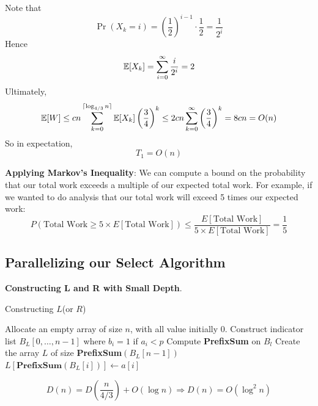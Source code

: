 \documentclass[11pt]{article}
\begin{document}
Note that
\begin{equation*}
\Pr(X_k=i)=\left( \frac{1}{2} \right)^{i-1}\cdot\frac{1}{2}=\frac{1}{2^i}
\end{equation*}
Hence
\begin{equation*}
\mathbb{E}[X_k]=\sum_{i=0}^\infty\frac{i}{2^i}=2
\end{equation*}
Ultimately,
\begin{equation*}
\mathbb{E}[W]\le cn\sum_{k=0}^{\lceil \log_{4/3}n \rceil}\mathbb{E}[X_k]\left( \frac{3}{4} \right)^k\le
2cn\sum_{k=0}^\infty\left( \frac{3}{4} \right)^k=8cn=O(n)
\end{equation*}
So in expectation,
\begin{equation*}
T_1=O(n)
\end{equation*}

\textbf{Applying Markov's Inequality}: We can compute a bound on the probability that our total work
 exceeds a multiple of our expected total work. For example, if we wanted to do analysis that
 our total work will exceed 5 times our expected work:
 \begin{equation*}
P(\text{Total Work}\ge 5\times E[\text{Total Work}])\le\frac{E[\text{Total Work}]}{5\times E[\text{Total Work}]}=\frac{1}{5}
 \end{equation*}
\subsection{Parallelizing our Select Algorithm}
\label{sec:org423ffac}
\textbf{Constructing L and R with Small Depth}.

\begin{algorithm}
\caption{Constructing \(L\)(or \(R\))}
\begin{algorithmic}[1]
\State Allocate an empty array of size \(n\), with all value initially 0.
\State Construct indicator list \(B_L[0,\dots,n-1]\) where \(b_i=1\) if \(a_i<p\)
\State Compute \textbf{PrefixSum} on \(B_l\)
\State Create the array \(L\) of size \textbf{PrefixSum}\((B_L[n-1])\)
        \State \(L[\textbf{PrefixSum}(B_L[i])]\leftarrow a[i]\)
    \EndIf
\EndFor
\end{algorithmic}
\end{algorithm}
\begin{equation*}
D(n)=D\left( \frac{n}{4/3} \right)+O(\log n)\Rightarrow D(n)=O(\log^2n)
\end{equation*}
\end{document}
